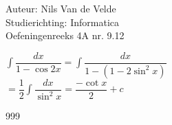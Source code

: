 \documentclass[a4paper]{article}
\begin{document}
  
\noindent \large Auteur: Nils Van de Velde \\
\noindent \large Studierichting: Informatica\\
\noindent \large Oefeningenreeks 4A nr. 9.12\\

\medskip

\normalsize

$\displaystyle\int\dfrac{dx}{1-\cos2x}=\displaystyle\int\dfrac{dx}{1-(1-2\sin^2x)}$\\

$=\dfrac{1}{2}\displaystyle\int\dfrac{dx}{\sin^2x}=\dfrac{-\cot x}{2}+c$\\

\begin{thebibliography}{999}
\end{thebibliography}
\end{document}
